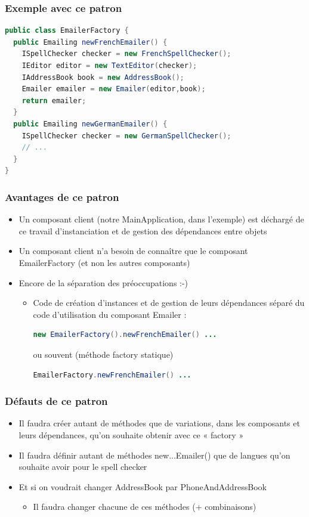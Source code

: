 \documentclass{beamer}
\begin{document}
\begin{frame}[fragile]
  \frametitle{Exemple avec ce patron}  
\begin{lstlisting}[language=Java]
public class EmailerFactory {
  public Emailing newFrenchEmailer() {
    ISpellChecker checker = new FrenchSpellChecker();
    IEditor editor = new TextEditor(checker);
    IAddressBook book = new AddressBook();
    Emailer emailer = new Emailer(editor,book);
    return emailer;
  }
  public Emailing newGermanEmailer() {
    ISpellChecker checker = new GermanSpellChecker();
    // ...
  }
}
\end{lstlisting}
\end{frame}

\begin{frame}[fragile]
  \frametitle{Avantages de ce patron}  
  \begin{itemize}
  \item Un composant client (notre MainApplication, dans l'exemple)
est déchargé de ce travail d'instanciation et de gestion
des dépendances entre objets
\item Un composant client n'a besoin de connaître que le composant
EmailerFactory (et non les autres composants)
\item Encore de la séparation des préoccupations :-)
    \begin{itemize}
  \item
Code de création d'instances et de gestion de leurs dépendances
séparé du code d'utilisation du composant Emailer :
\begin{lstlisting}[language=Java]
  new EmailerFactory().newFrenchEmailer() ...
\end{lstlisting}
ou souvent (méthode factory statique)
\begin{lstlisting}[language=Java]
  EmailerFactory.newFrenchEmailer() ...
\end{lstlisting}

  \end{itemize}
\end{itemize}
\end{frame}

\begin{frame}[fragile]
  \frametitle{Défauts de ce patron}  
  \begin{itemize}
  \item Il faudra créer autant de méthodes que de variations, dans les
    composants et leurs dépendances, qu'on souhaite obtenir avec ce «
    factory »
  \item Il faudra définir autant de méthodes new...Emailer() que de
    langues qu'on souhaite avoir pour le spell checker
  \item Et si on voudrait changer AddressBook par PhoneAndAddressBook
    \begin{itemize}
    \item Il faudra changer chacune de ces méthodes (+ combinaisons)
    \end{itemize}
  \end{itemize}
\end{frame}
\end{document}
